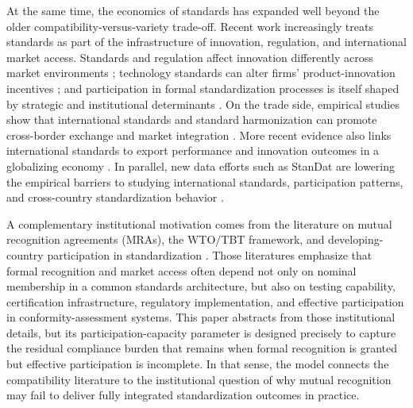 At the same time, the economics of standards has expanded well beyond the older compatibility-versus-variety trade-off. Recent work increasingly treats standards as part of the infrastructure of innovation, regulation, and international market access. Standards and regulation affect innovation differently across market environments \citep{BlindPetersenRiillo2017}; technology standards can alter firms' product-innovation incentives \citep{FoucartLi2021}; and participation in formal standardization processes is itself shaped by strategic and institutional determinants \citep{BlindVonLaer2022,BlindKenneyLeiponenSimcoe2023}. On the trade side, empirical studies show that international standards and standard harmonization can promote cross-border exchange and market integration \citep{CloughertyGrajek2014,SchmidtSteingress2022}. More recent evidence also links international standards to export performance and innovation outcomes in a globalizing economy \citep{BlindMuench2024,WangZhu2025}. In parallel, new data efforts such as StanDat are lowering the empirical barriers to studying international standards, participation patterns, and cross-country standardization behavior \citep{Bjorkholt2026}.

A complementary institutional motivation comes from the literature on mutual
recognition agreements (MRAs), the WTO/TBT framework, and developing-country
participation in standardization \citep{WTO_TBT,ISO_UNIDO}. Those literatures
emphasize that formal recognition and market access often depend not only on
nominal membership in a common standards architecture, but also on testing
capability, certification infrastructure, regulatory implementation, and
effective participation in conformity-assessment systems. This paper abstracts
from those institutional details, but its participation-capacity parameter is
designed precisely to capture the residual compliance burden that remains when
formal recognition is granted but effective participation is incomplete. In
that sense, the model connects the compatibility literature to the
institutional question of why mutual recognition may fail to deliver fully
integrated standardization outcomes in practice.

